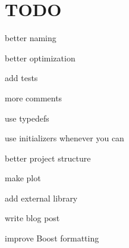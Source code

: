 \section*{T\+O\+DO}


\begin{DoxyItemize}
\item better naming
\item better optimization
\item add tests
\item more comments
\item use typedefs
\item use initializers whenever you can
\item better project structure
\item make plot
\item add external library
\item write blog post
\item improve Boost formatting 
\end{DoxyItemize}